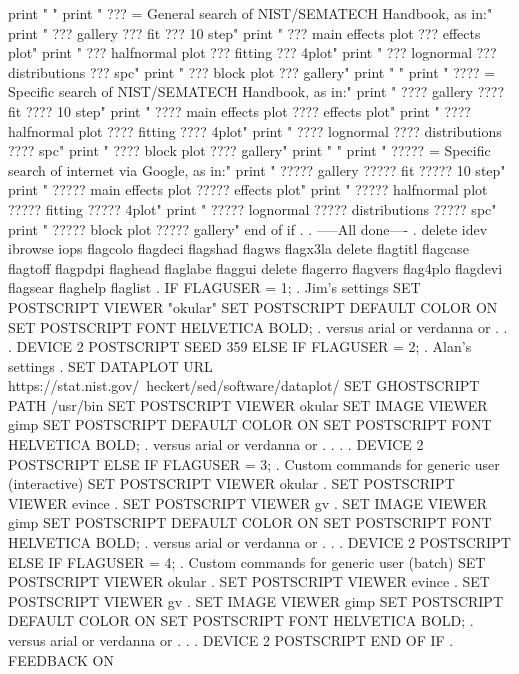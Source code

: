    print " "
   print "    ??? = General  search of NIST/SEMATECH Handbook, as in:"
   print "          ??? gallery   ??? fit   ??? 10 step"
   print "          ??? main effects plot   ??? effects plot"
   print "          ??? halfnormal plot     ??? fitting   ??? 4plot"
   print "          ??? lognormal   ??? distributions   ??? spc"
   print "          ??? block plot  ??? gallery"
   print " "
   print "   ???? = Specific search of NIST/SEMATECH Handbook, as in:"
   print "          ???? gallery   ???? fit   ???? 10 step"
   print "          ???? main effects plot   ???? effects plot"
   print "          ???? halfnormal plot     ???? fitting   ???? 4plot"
   print "          ???? lognormal   ???? distributions   ???? spc"
   print "          ???? block plot   ???? gallery"
   print " "
   print "  ????? = Specific search of internet via Google, as in:"
   print "          ????? gallery   ????? fit   ????? 10 step"
   print "          ????? main effects plot   ????? effects plot"
   print "          ????? halfnormal plot     ????? fitting   ????? 4plot"
   print "          ????? lognormal   ????? distributions   ????? spc"
   print "          ????? block plot   ????? gallery"
end of if
.
. -----All done----
.
delete idev ibrowse iops flagcolo flagdeci flagshad flagws flagx3la
delete flagtitl flagcase flagtoff flagpdpi flaghead flaglabe flaggui
delete flagerro flagvers flag4plo flagdevi flagsear flaghelp flaglist
.
IF FLAGUSER = 1; . Jim's settings
   SET POSTSCRIPT VIEWER "okular"
   SET POSTSCRIPT DEFAULT COLOR ON
   SET POSTSCRIPT FONT HELVETICA BOLD; . versus arial or verdanna or . . .
   DEVICE 2 POSTSCRIPT
   SEED 359
ELSE IF FLAGUSER = 2; . Alan's settings
   . SET DATAPLOT URL https://stat.nist.gov/~heckert/sed/software/dataplot/
   SET GHOSTSCRIPT PATH /usr/bin
   SET POSTSCRIPT VIEWER okular
   SET IMAGE VIEWER gimp
   SET POSTSCRIPT DEFAULT COLOR ON
   SET POSTSCRIPT FONT HELVETICA BOLD; . versus arial or verdanna or . . .
   . DEVICE 2 POSTSCRIPT
ELSE IF FLAGUSER = 3; . Custom commands for generic user (interactive)
   SET POSTSCRIPT VIEWER okular
   . SET POSTSCRIPT VIEWER evince
   . SET POSTSCRIPT VIEWER gv
   . SET IMAGE VIEWER gimp
   SET POSTSCRIPT DEFAULT COLOR ON
   SET POSTSCRIPT FONT HELVETICA BOLD; . versus arial or verdanna or . . .
   DEVICE 2 POSTSCRIPT
ELSE IF FLAGUSER = 4; . Custom commands for generic user (batch)
   SET POSTSCRIPT VIEWER okular
   . SET POSTSCRIPT VIEWER evince
   . SET POSTSCRIPT VIEWER gv
   . SET IMAGE VIEWER gimp
   SET POSTSCRIPT DEFAULT COLOR ON
   SET POSTSCRIPT FONT HELVETICA BOLD; . versus arial or verdanna or . . .
   DEVICE 2 POSTSCRIPT
END OF IF
.
FEEDBACK ON
